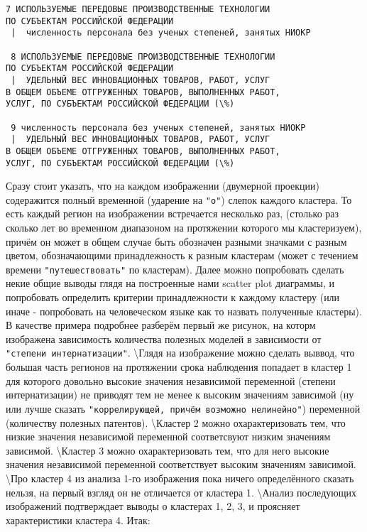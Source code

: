 \documentclass[11pt]{article}
\begin{document}
\begin{Verbatim}[commandchars=\\\{\}]
 7 ИСПОЛЬЗУЕМЫЕ ПЕРЕДОВЫЕ ПРОИЗВОДСТВЕННЫЕ ТЕХНОЛОГИИ
ПО СУБЪЕКТАМ РОССИЙСКОЙ ФЕДЕРАЦИИ 
 |  численность персонала без ученых степеней, занятых НИОКР

 8 ИСПОЛЬЗУЕМЫЕ ПЕРЕДОВЫЕ ПРОИЗВОДСТВЕННЫЕ ТЕХНОЛОГИИ
ПО СУБЪЕКТАМ РОССИЙСКОЙ ФЕДЕРАЦИИ 
 |  УДЕЛЬНЫЙ ВЕС ИННОВАЦИОННЫХ ТОВАРОВ, РАБОТ, УСЛУГ
В ОБЩЕМ ОБЪЕМЕ ОТГРУЖЕННЫХ ТОВАРОВ, ВЫПОЛНЕННЫХ РАБОТ,
УСЛУГ, ПО СУБЪЕКТАМ РОССИЙСКОЙ ФЕДЕРАЦИИ (\%)

 9 численность персонала без ученых степеней, занятых НИОКР 
 |  УДЕЛЬНЫЙ ВЕС ИННОВАЦИОННЫХ ТОВАРОВ, РАБОТ, УСЛУГ
В ОБЩЕМ ОБЪЕМЕ ОТГРУЖЕННЫХ ТОВАРОВ, ВЫПОЛНЕННЫХ РАБОТ,
УСЛУГ, ПО СУБЪЕКТАМ РОССИЙСКОЙ ФЕДЕРАЦИИ (\%)

    \end{Verbatim}

    Сразу стоит указать, что на каждом изображении (двумерной проекции)
содеражится полный временной (ударение на \verb'"о"') слепок каждого
кластера. То есть каждый регион на изображении встречается несколько
раз, (столько раз сколько лет во временном диапазоном на протяжении
которого мы кластеризуем), причём он может в общем случае быть обозначен
разными значками с разным цветом, обозначающими принадлежность к разным
кластерам (может с течением времени \verb'"путешествовать"' по
кластерам). Далее можно попробовать сделать некие общие выводы глядя на
построенные нами scatter plot диаграммы, и попробовать определить
критерии принадлежности к каждому кластеру (или иначе - попробовать на
человеческом языке как то назвать полученные кластеры). В качестве
примера подробнее разберём первый же рисунок, на которм изображена
зависимость количества полезных моделей в зависимости от
\verb'"степени интернатизации"'. \textbackslash{}Глядя на изображение
можно сделать выввод, что большая часть регионов на протяжении срока
наблюдения попадает в кластер 1 для которого довольно высокие значения
независимой переменной (степени интернатизации) не приводят тем не менее
к высоким значениям зависимой (ну или лучше сказать
\verb'"коррелирующей, причём возможно нелинейно"') переменной
(количеству полезных патентов). \textbackslash{}Кластер 2 можно
охарактеризовать тем, что низкие значения независимой переменной
соответсвуют низким значениям зависимой. \textbackslash{}Кластер 3 можно
охарактеризовать тем, что для него высокие значения независимой
переменной соответствует высоким значениям зависимой.
\textbackslash{}Про кластер 4 из анализа 1-го изображения пока ничего
определённого сказать нельзя, на первый взгляд он не отличается от
кластера 1. \textbackslash{}Анализ последующих изображений подтверждает
выводы о кластерах 1, 2, 3, и проясняет характеристики кластера 4. Итак:
\end{document}
